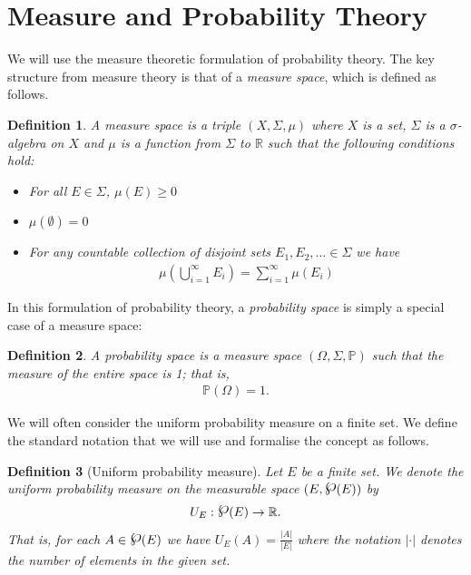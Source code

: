 \documentclass{article}
\newcommand{\powerset}{\raisebox{.15\baselineskip}{\Large\ensuremath{\wp}}}
\newtheorem{definition}{Definition}
\theoremstyle{remark}
\renewcommand{\P}{\mathbb{P}}
\begin{document}
\newpage
\appendix

\section{Measure and Probability Theory}\label{app:prob}

We will use the measure theoretic formulation of probability theory. The key
structure from measure theory is that of a \textit{measure space}, which is
defined as follows.

\begin{definition}
	A measure space is a triple $(X, \Sigma, \mu)$ where $X$ is a set, $\Sigma$
	is a $\sigma$-algebra on $X$ and $\mu$ is a function from $\Sigma$ to
	$\mathbb{R}$ such that the following conditions hold:
	\begin{itemize}
		\item For all $E \in \Sigma$, $\mu(E) \ge 0$
		\item $\mu(\emptyset) = 0$
		\item For any countable collection of disjoint sets $E_1, E_2, \ldots
			\in \Sigma$ we have
			\begin{align*}
				\mu\left(\bigcup_{i=1}^\infty E_i\right) =
				\sum_{i=1}^\infty \mu(E_i)
			\end{align*}
	\end{itemize}
\end{definition}

In this formulation of probability theory, a \textit{probability space} is
simply a special case of a measure space:

\begin{definition}
	A probability space is a measure space $(\Omega, \Sigma, \P)$ such that the
	measure of the entire space is 1; that is,
	\begin{align*}
		\P(\Omega) = 1.
	\end{align*}
\end{definition}

We will often consider the uniform probability measure on a finite set. We
define the standard notation that we will use and formalise the concept as
follows.

\begin{definition}[Uniform probability measure]
	Let $E$ be a finite set. We denote the uniform probability measure on the
	measurable space $(E, \powerset(E))$ by
	\begin{align*}
		U_E: \powerset(E) \to \mathbb{R}.
	\end{align*}
	That is, for each $A \in \powerset(E)$ we have $U_E(A) = \frac{|A|}{|E|}$
	where the notation $|\cdot|$ denotes the number of elements in the given
	set.
\end{definition}
\end{document}

